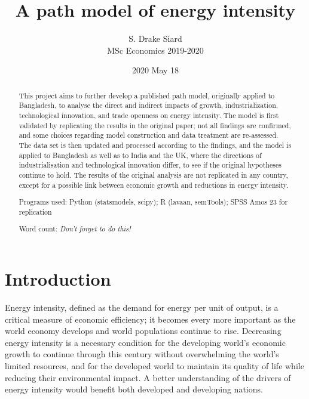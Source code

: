 \documentclass[11pt,a4paper]{article}
\title{\textbf{A path model of energy intensity}}
\author{S. Drake Siard\\
MSc Economics 2019-2020}
\date{2020 May 18}
\newcommand{\pkg}[1]{{\fontseries{b}\selectfont #1}}
\begin{document}
\maketitle

\begin{abstract}
This project aims to further develop a published path model, originally applied to Bangladesh, to analyse the direct and indirect impacts of growth, industrialization, technological innovation, and trade openness on energy intensity.
The model is first validated by replicating the results in the original paper; not all findings are confirmed, and some choices regarding model construction and data treatment are re-assessed.
The data set is then updated and processed according to the findings, and the model is applied to Bangladesh as well as to India and the UK, where the directions of industrialisation and technological innovation differ, to see if the original hypotheses continue to hold.
The results of the original analysis are not replicated in any country, except for a possible link between economic growth and reductions in energy intensity.

Programs used: Python (\pkg{statsmodels}, \pkg{scipy}); R (\pkg{lavaan}, \pkg{semTools}); SPSS Amos 23 for replication

Word count: \em{Don't forget to do this!}
 
\end{abstract}

\tableofcontents

\pagebreak

\section{Introduction}\label{sec:introduction}

Energy intensity, defined as the demand for energy per unit of output, is a critical measure of economic efficiency; it becomes every more important as the world economy develops and world populations continue to rise.
Decreasing energy intensity is a necessary condition for the developing world's economic growth to continue through this century without overwhelming the world's limited resources, and for the developed world to maintain its quality of life while reducing their environmental impact.
A better understanding of the drivers of energy intensity would benefit both developed and developing nations.
\end{document}
